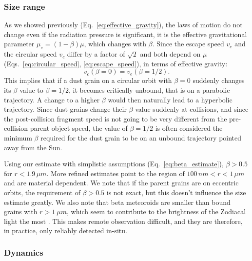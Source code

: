 \subsubsection{Size range}

As we showed previously (Eq.~\ref{eq:effective_gravity}), the laws of motion do not change even if the radiation pressure is significant, it is the effective gravitational parameter $\mu_{e} = (1-\beta) \mu$, which changes with $\beta$. Since the escape speed $v_e$ and the circular speed $v_c$ differ by a factor of $\sqrt{2}$ and both depend on $\mu$ (Eqs.~\ref{eq:circular_speed}, \ref{eq:escape_speed}), in terms of effective gravity:
\begin{equation}
    v_c(\beta=0) = v_e(\beta=1/2).
\end{equation}
This implies that if a dust grain on a circular orbit with $\beta=0$ suddenly changes its $\beta$ value to $\beta = 1/2$, it becomes critically unbound, that is on a parabolic trajectory. A change to a higher $\beta$ would then naturally lead to a hyperbolic trajectory. Since dust grains change their $\beta$ value suddenly at collisions, and since the post-collision fragment speed is not going to be very different from the pre-collision parent object speed, the value of $\beta=1/2$ is often considered the minimum $\beta$ required for the dust grain to be on an unbound trajectory pointed away from the Sun.

Using our estimate with simplistic assumptions (Eq.~\ref{eq:beta_estimate}), $\beta > 0.5$ for $r < 1.9 \, \si{\mu m}$. More refined estimates \citep{kimura2003composition} point to the region of $100 \, \si{nm} < r < 1 \, \si{\mu m}$ and are material dependent. We note that if the parent grains are on eccentric orbits, the requirement of $\beta > 0.5$ is not exact, but this doesn't influence the size estimate greatly. We also note that beta meteoroids are smaller than bound grains with $r>\SI{1}{\mu m}$, which seem to contribute to the brightness of the Zodiacal light the most \citep{leinert1981zodiacal}. This makes remote observation difficult, and they are therefore, in practice, only reliably detected in-situ.

\subsubsection{Dynamics}

